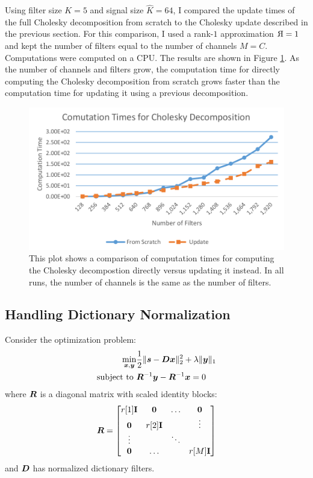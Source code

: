 Using filter size $K = 5$ and signal size $\hat{K} = 64$, I compared the update times of the full Cholesky decomposition from scratch to the Cholesky update described in the previous section. For this comparison, I used a rank-$1$ approximation $\reflectbox{R} = 1$ and kept the number of filters equal to the number of channels $M = C$. Computations were computed on a CPU. The results are shown in Figure \ref{Figure:Computational Comparison}. As the number of channels and filters grow, the computation time for directly computing the Cholesky decomposition from scratch grows faster than the computation time for updating it using a previous decomposition.

\begin{figure}
\includegraphics[width=\textwidth]{figures/computationtimes.png}
\caption{This plot shows a comparison of computation times for computing the Cholesky decompostion directly versus updating it instead. In all runs, the number of channels is the same as the number of filters.}
\label{Figure:Computational Comparison}
\end{figure}


\subsection{Handling Dictionary Normalization}
Consider the optimization problem:
%
\begin{equation}
\begin{aligned}
\min_{\bm{x},\bm{y}} & \frac{1}{2}\|\bm{s} -\bm{D}\bm{x}\|_2^2 + \lambda\|\bm{y}\|_1 \\
\text{subject to } & \bm{R}^{-1}\bm{y} - \bm{R}^{-1}\bm{x} = 0 
\end{aligned}
\end{equation}
%
where $\bm{R}$ is a diagonal matrix with scaled identity blocks:
%
\begin{equation}
\bm{R} = \begin{bmatrix} r[1]{\bf I} & \bm{0} & \hdots & \bm{0} \\ \bm{0} & r[2]{\bf I} &  & \vdots \\ \vdots &  & \ddots &   \\ \bm{0} & \hdots &  & r[M]{\bf I} \end{bmatrix}
\end{equation}
%
and $\bm{D}$ has normalized dictionary filters.

